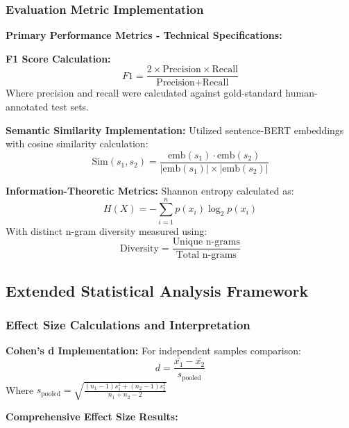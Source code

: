 \documentclass{article}
\begin{document}
\subsubsection{Evaluation Metric Implementation}

\textbf{Primary Performance Metrics - Technical Specifications:}

\textbf{F1 Score Calculation:}
\begin{equation}
F1 = \frac{2 \times \text{Precision} \times \text{Recall}}{\text{Precision} + \text{Recall}}
\end{equation}
Where precision and recall were calculated against gold-standard human-annotated test sets.

\textbf{Semantic Similarity Implementation:}
Utilized sentence-BERT embeddings with cosine similarity calculation:
\begin{equation}
\text{Sim}(s_1, s_2) = \frac{\text{emb}(s_1) \cdot \text{emb}(s_2)}{|\text{emb}(s_1)| \times |\text{emb}(s_2)|}
\end{equation}

\textbf{Information-Theoretic Metrics:}
Shannon entropy calculated as:
\begin{equation}
H(X) = -\sum_{i=1}^{n} p(x_i) \log_2 p(x_i)
\end{equation}
With distinct n-gram diversity measured using:
\begin{equation}
\text{Diversity} = \frac{\text{Unique n-grams}}{\text{Total n-grams}}
\end{equation}

\subsection{Extended Statistical Analysis Framework}
\label{appendix:statistical_methods}

\subsubsection{Effect Size Calculations and Interpretation}

\textbf{Cohen's d Implementation:}
For independent samples comparison:
\begin{equation}
d = \frac{\bar{x_1} - \bar{x_2}}{s_{\text{pooled}}}
\end{equation}
Where $s_{\text{pooled}} = \sqrt{\frac{(n_1-1)s_1^2 + (n_2-1)s_2^2}{n_1 + n_2 - 2}}$

\textbf{Comprehensive Effect Size Results:}
\end{document}
